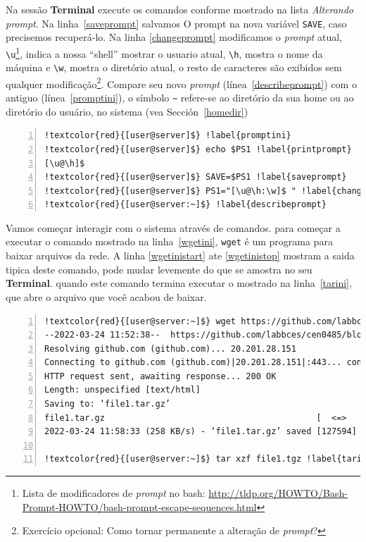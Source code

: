 \documentclass[letter,11pt]{book}
\begin{document}
Na sessão  \textbf{Terminal} execute os comandos conforme mostrado na lista \textit{Alterando prompt}. Na linha~\ref{saveprompt} salvamos O prompt na nova variável \Verb+SAVE+, caso precisemos recuperá-lo. Na linha \ref{changeprompt} modificamos o \textit{prompt} atual, \Verb+\u+\footnote{Lista de modificadores de \textit{prompt} no bash: \url{http://tldp.org/HOWTO/Bash-Prompt-HOWTO/bash-prompt-escape-sequences.html}}, indica a nossa ``shell'' mostrar o usuario atual, \Verb+\h+, mostra o nome da  máquina e \Verb+\w+, mostra o diretório atual, o resto de caracteres são exibidos sem qualquer modificação\footnote{Exercício opcional: {\textquestiondown}Como tornar permanente a alteração de \textit{prompt}?}. Compare seu novo \textit{prompt} (línea~\ref{describeprompt}) com o antiguo (línea~\ref{promptini}), o símbolo \Verb+~+ refere-se ao diretório da sua home ou ao diretório do usuário, no sistema  (vea Sección~\ref{homedir})

\begin{Verbatim}[commandchars=!\{\},numbers=left,label=Alterando o prompt,frame=topline,fontsize=\scriptsize]
!textcolor{red}{[user@server]$} !label{promptini}
!textcolor{red}{[user@server]$} echo $PS1 !label{printprompt}
[\u@\h]$
!textcolor{red}{[user@server]$} SAVE=$PS1 !label{saveprompt}
!textcolor{red}{[user@server]$} PS1="[\u@\h:\w]$ " !label{changeprompt}
!textcolor{red}{[user@server:~]$} !label{describeprompt}
\end{Verbatim} 

Vamos começar interagir com o sistema através de comandos. para começar a executar o comando mostrado na linha~\ref{wgetini}, \Verb+wget+ é um programa para baixar arquivos da rede. A linha \ref{wgetinistart} ate \ref{wgetinistop} mostram a saida tipica deste comando, pode mudar levemente do que se amostra no seu \textbf{Terminal}. quando este comando termina executar o mostrado na linha~\ref{tarini}, que abre o arquivo que você acabou de baixar.

\begin{Verbatim}[commandchars=!\{\},numbers=left,firstnumber=last,label=Baixando arquivos, frame=topline,fontsize=\scriptsize]
!textcolor{red}{[user@server:~]$} wget https://github.com/labbces/cen0485/blob/main/linux/practicas/file1.tar.gz !label{wgetini}
--2022-03-24 11:52:38--  https://github.com/labbces/cen0485/blob/main/linux/practicas/file1.tar.gz !label{wgetinistart}
Resolving github.com (github.com)... 20.201.28.151
Connecting to github.com (github.com)|20.201.28.151|:443... connected.
HTTP request sent, awaiting response... 200 OK
Length: unspecified [text/html]
Saving to: ‘file1.tar.gz’
file1.tar.gz                                          [  <=>                                                                                                      ] 124,60K   258KB/s    in 0,5s    
2022-03-24 11:58:33 (258 KB/s) - ‘file1.tar.gz’ saved [127594] !label{wgetinistop}

!textcolor{red}{[user@server:~]$} tar xzf file1.tgz !label{tarini}
\end{Verbatim} 
\end{document}

